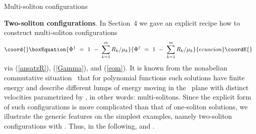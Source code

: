 \documentclass[a4paper,11pt]{article}
\makeatletter
\renewcommand{\section}{\@startsection{section}{1}{0pt}{\medskipamount}
{\medskipamount}{\large\bf}}
\numberwithin{equation}{section}
\def\e{\mbox{e}}
\def\i{\mbox{i}}
\makeatother
\begin{document}
\section{Multi-soliton configurations}

\noindent
{\bf Two-soliton configurations}.
In Section~4 we gave an explicit recipe how to construct multi-soliton
configurations
\begin{equation}\coord{}\boxEquation{
\Phi^\dagger\ =\ 1\ -\ \sum_{k=1}^m R_k/\mu_k
}{
\Phi^\dagger\ =\ 1\ -\ \sum_{k=1}^m R_k/\mu_k
}{ecuacion}\coordE{}\end{equation}
via (\ref{ansatzR}), (\ref{Gamma}), and (\ref{eom}).
It is known from the nonabelian commutative situation~\cite{ward}
that for polynomial functions \coordHE{} such solutions have finite energy
and describe \coordHE{} different lumps of energy moving in the \coordHE{}~plane with
distinct velocities \coordHE{} parametrized by
\myHighlight{$\mu_k{=}\e^{\eta_k-\i\varphi_k}$}\coordHE{}, in other words: multi-solitons.
Since the explicit form of such configurations is more complicated than
that of one-soliton solutions, we illustrate the generic
features on the simplest examples, namely two-soliton configurations
with \coordHE{}. Thus, in the following, \coordHE{} and \coordHE{}.
\end{document}

